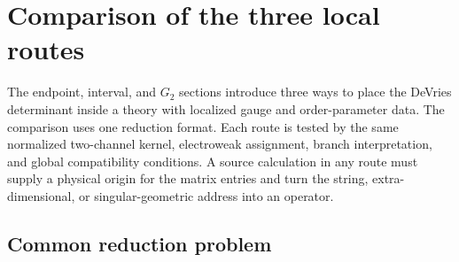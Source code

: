 \section{Comparison of the three local routes}
\label{sec:route-comparison}

The endpoint, interval, and \(G_2\) sections introduce three ways to place the DeVries determinant inside a theory with localized gauge and order-parameter data.  The comparison uses one reduction format.  Each route is tested by the same normalized two-channel kernel, electroweak assignment, branch interpretation, and global compatibility conditions.  A source calculation in any route must supply a physical origin for the matrix entries and turn the string, extra-dimensional, or singular-geometric address into an operator.

\subsection{Common reduction problem}
\label{sec:common-reduction-problem}

